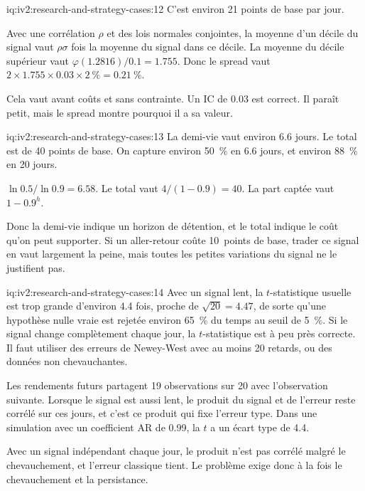 \begin{solution}{iq:iv2:research-and-strategy-cases:12}
C'est environ 21 points de base par jour.

Avec une corrélation $\rho$ et des lois normales conjointes, la moyenne d'un décile du signal vaut $\rho\sigma$ fois la moyenne du signal dans ce décile. La moyenne du décile supérieur vaut $\varphi(1.2816)/0.1 = 1.755$. Donc le spread vaut $2 \times 1.755 \times 0.03 \times 2~\% = 0.21~\%$.

Cela vaut avant coûts et sans contrainte. Un IC de 0.03 est correct. Il paraît petit, mais le spread montre pourquoi il a sa valeur.

\end{solution}

\begin{solution}{iq:iv2:research-and-strategy-cases:13}
La demi-vie vaut environ 6.6 jours. Le total est de 40 points de base. On capture environ 50~\% en 6.6 jours, et environ 88~\% en 20 jours.

$\ln 0.5/\ln 0.9 = 6.58$. Le total vaut $4/(1 - 0.9) = 40$. La part captée vaut $1 - 0.9^h$.

Donc la demi-vie indique un horizon de détention, et le total indique le coût qu'on peut supporter. Si un aller-retour coûte 10~points de base, trader ce signal en vaut largement la peine, mais toutes les petites variations du signal ne le justifient pas.

\end{solution}

\begin{solution}{iq:iv2:research-and-strategy-cases:14}
Avec un signal lent, la $t$-statistique usuelle est trop grande d'environ 4.4 fois, proche de $\sqrt{20} = 4.47$, de sorte qu'une hypothèse nulle vraie est rejetée environ 65~\% du temps au seuil de 5~\%. Si le signal change complètement chaque jour, la $t$-statistique est à peu près correcte. Il faut utiliser des erreurs de Newey-West avec au moins 20 retards, ou des données non chevauchantes.

Les rendements futurs partagent 19 observations sur 20 avec l'observation suivante. Lorsque le signal est aussi lent, le produit du signal et de l'erreur reste corrélé sur ces jours, et c'est ce produit qui fixe l'erreur type. Dans une simulation avec un coefficient AR de 0.99, la $t$ a un écart type de 4.4.

Avec un signal indépendant chaque jour, le produit n'est pas corrélé malgré le chevauchement, et l'erreur classique tient. Le problème exige donc à la fois le chevauchement et la persistance.

\end{solution}

